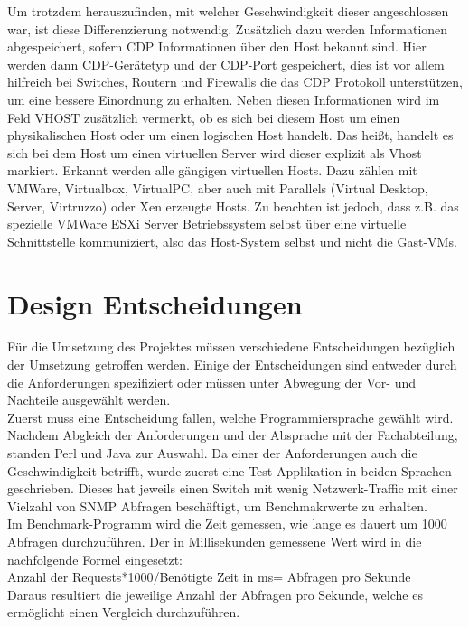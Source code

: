 Um trotzdem herauszufinden, mit welcher Geschwindigkeit dieser angeschlossen war, ist diese Differenzierung notwendig. Zusätzlich dazu werden Informationen abgespeichert, sofern CDP Informationen über den Host bekannt sind. Hier werden dann CDP-Gerätetyp und der CDP-Port gespeichert, dies ist vor allem hilfreich bei Switches, Routern und Firewalls die das CDP Protokoll unterstützen, um eine bessere Einordnung zu erhalten.
Neben diesen Informationen wird im Feld VHOST zusätzlich vermerkt, ob es sich bei diesem Host um einen physikalischen Host oder um einen logischen Host handelt. Das heißt, handelt es sich bei dem Host um einen virtuellen Server wird dieser explizit als Vhost markiert. Erkannt werden alle gängigen virtuellen Hosts. Dazu zählen mit VMWare, Virtualbox, VirtualPC, aber auch mit Parallels (Virtual Desktop, Server, Virtruzzo) oder Xen erzeugte Hosts. Zu beachten ist jedoch, dass z.B. das spezielle VMWare ESXi Server Betriebssystem selbst über eine virtuelle Schnittstelle kommuniziert, also das Host-System selbst und nicht die Gast-VMs.


\section{Design Entscheidungen}
\label{sec:designent}

Für die Umsetzung des Projektes müssen verschiedene Entscheidungen bezüglich der Umsetzung getroffen werden. Einige der Entscheidungen sind entweder durch die Anforderungen spezifiziert oder müssen unter Abwegung der Vor- und Nachteile ausgewählt werden.\\
Zuerst muss eine Entscheidung fallen, welche Programmiersprache gewählt wird. Nachdem Abgleich der Anforderungen und der Absprache mit der Fachabteilung, standen Perl und Java zur Auswahl. Da einer der Anforderungen auch die Geschwindigkeit betrifft, wurde zuerst eine Test Applikation in beiden Sprachen geschrieben.
Dieses hat jeweils einen Switch mit wenig Netzwerk-Traffic mit einer Vielzahl von SNMP Abfragen beschäftigt, um Benchmakrwerte zu erhalten.\\
Im Benchmark-Programm wird die Zeit gemessen, wie lange es dauert um 1000 Abfragen durchzuführen.
Der in Millisekunden gemessene Wert wird in die nachfolgende Formel eingesetzt:\\

Anzahl der Requests*1000/Benötigte Zeit in ms= Abfragen pro Sekunde\\

Daraus resultiert die jeweilige Anzahl der Abfragen pro Sekunde, welche es ermöglicht einen Vergleich durchzuführen.\\

